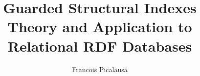 \usepackage{phdthesis}
\usepackage{appendix}
\usepackage{makeidx}
\usepackage{changepage}
\usepackage[english,french]{babel}
\usepackage[T1]{fontenc}
\usepackage[utf8]{inputenc}
\usepackage{graphicx}        %
\usepackage{multicol}        %
\usepackage{xspace}
\usepackage{cite} %
\usepackage{comment}
\usepackage{ifsym} %
\usepackage{amsmath}
\usepackage{import}
\usepackage{lmodern}
\usepackage{hyphenat}
\usepackage{longtable}
\usepackage{cleveref}
\usepackage{rotating}  %
\usepackage[linesnumbered,ruled]{algorithm2e}
\usepackage[final]{pdfpages}
\usetikzlibrary{arrows,automata,calc,shapes}



\newcommand{\footnoteremember}[2]{
    \footnote{\label{fn:#1}#2}
}
\newcommand{\footnoterecall}[1]{
    \labelcref{fn:#1}
}





\title{Guarded Structural Indexes\\\small{Theory and Application to
Relational RDF Databases}}
\author{Francois Picalausa}

\makeindex


